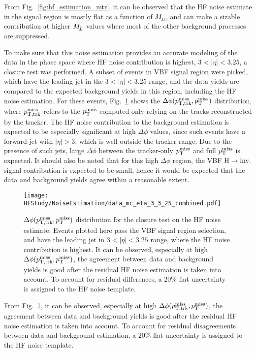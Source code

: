 From Fig.~\ref{fig:hf_estimation_mtr}, it can be observed that the HF noise estimate in the signal region is mostly
flat as a function of $M_{\textrm{jj}}$, and can make a sizable contribution at higher $M_{\textrm{jj}}$ values where most of the other background
processes are suppressed.

To make sure that this noise estimation provides an accurate modeling of the data in the phase space where HF noise contribution is highest,
$3 < |\eta| < 3.25$, a closure test was performed. A subset of events in VBF signal region were picked, which have the leading jet in
the $3 < |\eta| < 3.25$ range, and the data yields are compared to the expected background yields in this region, including the HF noise estimation.
For these events, Fig.~\ref{fig:hf_noise_closure} shows the $\Delta\phi(p_{\mathrm{T, trk}}^{\mathrm{miss}}, p_{\textrm{T}}^{\textrm{miss}})$ distribution, where $p_{\mathrm{T, trk}}^{\mathrm{miss}}$ refers to the
$p_{\textrm{T}}^{\textrm{miss}}$ computed only relying on the tracks reconstructed by the tracker. The HF noise contribution to the background estimation is expected to be 
especially significant at high $\Delta\phi$ values,
since such events have a forward jet with $|\eta|>3$, which is well outside the tracker range. Due to the presence of such jets, 
large $\Delta\phi$ between the tracker-only $p_{\textrm{T}}^{\textrm{miss}}$
and full $p_{\textrm{T}}^{\textrm{miss}}$ is expected. It should also be noted that for this high $\Delta\phi$ region, the VBF $\textrm{H} \rightarrow \textrm{inv.}$ signal contribution is expected to be small,
hence it would be expected that the data and background yields agree within a reasonable extent.

\begin{figure}[h!]
    \centering
    \texttt{[image: HFStudy/NoiseEstimation/data\_mc\_eta\_3\_3\_25\_combined.pdf]}
    \caption{$\Delta\phi(p_{\mathrm{T, trk}}^{\mathrm{miss}}, p_{\textrm{T}}^{\textrm{miss}})$ distribution for the closure test on the HF noise estimate. Events plotted here pass the VBF signal 
    region selection, and have the leading jet in $3 < |\eta| < 3.25$ range, where the HF noise contribution is highest.
    It can be observed, especially at high $\Delta\phi(p_{\mathrm{T, trk}}^{\mathrm{miss}}, p_{\textrm{T}}^{\textrm{miss}})$, the agreement between data and background yields is good
    after the residual HF noise estimation is taken into account. To account for residual differences, a $20\%$ flat uncertainty is assigned to the HF noise template.}
    \label{fig:hf_noise_closure}
\end{figure}

From Fig.~\ref{fig:hf_noise_closure}, it can be observed, especially at high $\Delta\phi(p_{\mathrm{T, trk}}^{\mathrm{miss}}, p_{\textrm{T}}^{\textrm{miss}})$, the agreement between data and background yields is good
after the residual HF noise estimation is taken into account. To account for residual disagreements between data and background estimation, a $20\%$ flat uncertainty
is assigned to the HF noise template. 

